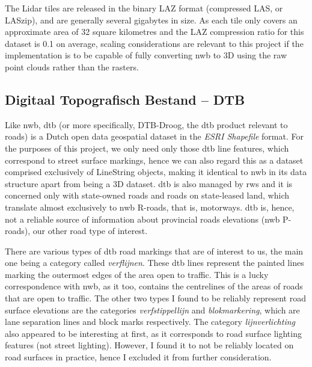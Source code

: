 The Lidar tiles are released in the binary LAZ format (compressed LAS, or LASzip), and are generally several gigabytes in size. As each tile only covers an approximate area of 32 square kilometres and the LAZ compression ratio for this dataset is 0.1 on average, scaling considerations are relevant to this project if the implementation is to be capable of fully converting \ac{nwb} to 3D using the raw point clouds rather than the rasters.

\subsection{Digitaal Topografisch Bestand – DTB}
\label{sub:dtb}

Like \ac{nwb}, \ac{dtb} (or more specifically, DTB-Droog, the \ac{dtb} product relevant to roads) is a Dutch open data geospatial dataset in the \textit{ESRI Shapefile} format. For the purposes of this project, we only need only those \ac{dtb} line features, which correspond to street surface markings, hence we can also regard this as a dataset comprised exclusively of LineString objects, making it identical to \ac{nwb} in its data structure apart from being a 3D dataset. \ac{dtb} is also managed by \ac{rws} and it is concerned only with state-owned roads and roads on state-leased land, which translate almost exclusively to \ac{nwb} R-roads, that is, motorways. \ac{dtb} is, hence, not a reliable source of information about provincial roads elevations (\ac{nwb} P-roads), our other road type of interest.

There are various types of \ac{dtb} road markings that are of interest to us, the main one being a category called \textit{verflijnen}. These \ac{dtb} lines represent the painted lines marking the outermost edges of the area open to traffic. This is a lucky correspondence with \ac{nwb}, as it too, contains the centrelines of the areas of roads that are open to traffic. The other two types I found to be reliably represent road surface elevations are the categories \textit{verfstippellijn} and \textit{blokmarkering}, which are lane separation lines and block marks respectively. The category \textit{lijnverlichting} also appeared to be interesting at first, as it corresponds to road surface lighting features (not street lighting). However, I found it to not be reliably located on road surfaces in practice, hence I excluded it from further consideration.

